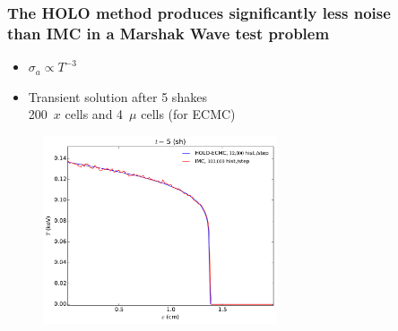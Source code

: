 \documentclass[xcolor=dvipsnames,hyperref={pdfpagelabels=false},unknownkeysallowed,
handout]{beamer}
\newcommand{\colb}[1]{{\color{blue} #1}}
\newcommand{\colG}[1]{{\color{Gray!110} #1}}
\newlength{\wideitemsep}
\let\olditem\item
\renewcommand{\item}{\setlength{\itemsep}{\wideitemsep}\olditem}
\begin{document}
\begin{frame}
    \frametitle{The HOLO method produces significantly less noise \\ than IMC in a Marshak Wave test problem}
    \centering
        \begin{itemize}
            \item \colb{$\sigma_a\propto T^{-3}$} 
            \item Transient solution after 5 shakes \\ \colG{200~$x$ cells and 4~$\mu$
                cells (for ECMC)}
        \end{itemize}
    \begin{figure}
    \includegraphics[width=0.615799\textwidth]{marshak_200_compare.pdf}
    \end{figure}
\end{frame}
\end{document}
